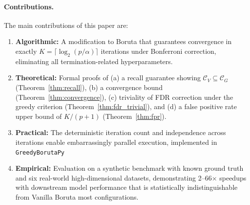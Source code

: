 \documentclass[runningheads]{llncs}
\begin{document}
\paragraph{Contributions.} The main contributions of this paper are:
\begin{enumerate}
    \item \textbf{Algorithmic:} A modification to Boruta that guarantees convergence in exactly $K = \lceil \log_2(p/\alpha) \rceil$ iterations under Bonferroni correction, eliminating all termination-related hyperparameters.
    \item \textbf{Theoretical:} Formal proofs of (a) a recall guarantee showing $\mathcal{C}_V \subseteq \mathcal{C}_G$ (Theorem~\ref{thm:recall}), (b) a convergence bound (Theorem~\ref{thm:convergence}), (c) triviality of FDR correction under the greedy criterion (Theorem~\ref{thm:fdr_trivial}), and (d) a false positive rate upper bound of $K/(p+1)$ (Theorem~\ref{thm:fpr}).
    \item \textbf{Practical:} The deterministic iteration count and independence across iterations enable embarrassingly parallel execution, implemented in \texttt{GreedyBorutaPy}
    \item \textbf{Empirical:} Evaluation on a synthetic benchmark with known ground truth and six real-world high-dimensional datasets, demonstrating 2--66$\times$ speedups with downstream model performance that is statistically indistinguishable from Vanilla Boruta most configurations.
\end{enumerate}


\end{document}
